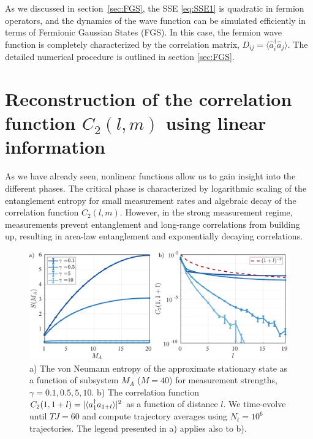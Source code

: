 As we discussed in section~\ref{sec:FGS}, the SSE \ref{eq:SSE1} is quadratic in fermion operators, and the dynamics of the wave function can be simulated efficiently in terms of Fermionic Gaussian States (FGS). In this case, the fermion wave function is completely characterized by the correlation matrix, $D_{ij} = \langle \hat{a}^\dagger_i \hat{a}_j \rangle$. The detailed numerical procedure is outlined in section \ref{sec:FGS}. 

\section{Reconstruction of the correlation function \texorpdfstring{$C_2(l,m)$}{TEXT} using linear information}

As we have already seen, nonlinear functions allow us to gain insight into the different phases. The critical phase is characterized by logarithmic scaling of the entanglement entropy for small measurement rates and algebraic decay of the correlation function $C_2(l,m)$. However, in the strong measurement regime, measurements prevent entanglement and long-range correlations from building up, resulting in area-law entanglement and exponentially decaying correlations. 

\begin{figure}[ht]
    \centering
    \includegraphics[width=\textwidth]{Chapters/Plots/Chapter5/Chapter4_Fig2.pdf}
    \caption{a) The von Neumann entropy of the approximate stationary state as a function of subsystem $M_A$ ($M = 40$) for measurement strengths, $\gamma = 0.1, 0.5, 5, 10$. b) The correlation function $C_2(1,1+l) = |\langle a_1^\dagger a_{1+l}\rangle|^2$ as a function of distance $l$. We time-evolve until $TJ = 60$ and compute trajectory averages using $N_t = 10^6$ trajectories. The legend presented in a) applies also to b).}
    \label{fig:Chapter4_Fig2}
\end{figure}

